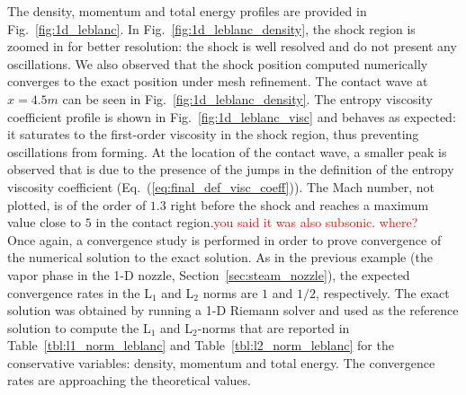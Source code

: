 \documentclass[preprint,10pt]{elsarticle}
\newcommand{\eqt}[1]{Eq.~(\ref{#1})}                     %
\newcommand{\fig}[1]{Fig.~\ref{#1}}                      %
\newcommand{\tbl}[1]{Table~\ref{#1}}                     %
\newcommand{\sct}[1]{Section~\ref{#1}}                   %
\newcommand{\tcr}[1]{\textcolor{red}{#1}}
\begin{document}
%
The density, momentum and total energy profiles are provided in \fig{fig:1d_leblanc}. In \fig{fig:1d_leblanc_density}, the shock region is zoomed in for better resolution: the shock is well resolved and do not present any oscillations. We also observed that the shock position computed numerically converges to the exact position under mesh refinement. The contact wave at $x=4.5m$ can be seen in \fig{fig:1d_leblanc_density}. The entropy viscosity coefficient profile is shown in \fig{fig:1d_leblanc_visc} and behaves as expected: it saturates to the first-order viscosity in the shock region, thus preventing oscillations from forming. At the location of the contact wave, a smaller peak is observed that is due to the presence of the jumps in the definition of the entropy viscosity coefficient (\eqt{eq:final_def_visc_coeff}).  The Mach number, not plotted, is of the order of $1.3$ right before the shock and reaches a maximum value close to $5$ in the contact region.\tcr{you said it was also subsonic. where?}\\
Once again, a convergence study is performed in order to prove convergence of the numerical solution to the exact solution. As in the previous example (the vapor phase in the 1-D nozzle, \sct{sec:steam_nozzle}), the expected convergence rates in the L$_1$ and L$_2$ norms are $1$ and $1/2$, respectively. The exact solution was obtained by running a 1-D Riemann solver and used as the reference solution to compute the L$_1$ and L$_2$-norms that are reported in \tbl{tbl:l1_norm_leblanc} and \tbl{tbl:l2_norm_leblanc} for the conservative variables: density, momentum and total energy. The convergence rates are approaching the theoretical values.
\end{document}
